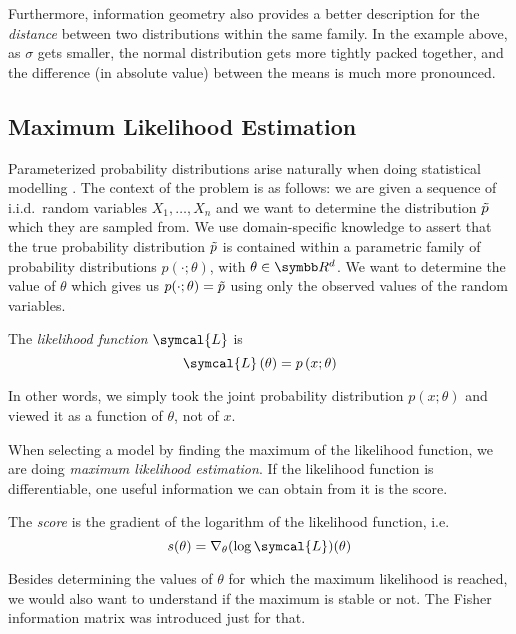 Furthermore, information geometry also provides a better description for the \emph{distance} between two distributions within the same family. In the example above, as \(\sigma\) gets smaller, the normal distribution gets more tightly packed together, and the difference (in absolute value) between the means is much more pronounced.

\subsection{Maximum Likelihood Estimation}

Parameterized probability distributions arise naturally when doing statistical modelling \cite{Rossi2018}. The context of the problem is as follows: we are given a sequence of i.i.d.\ random variables \(X_1, \dots, X_n\) and we want to determine the distribution \(\Tilde{p}\) which they are sampled from. We use domain-specific knowledge to assert that the true probability distribution \(\Tilde{p}\) is contained within a parametric family of probability distributions \(p(\cdot; \theta)\), with \(\theta \in \reals^d\). We want to determine the value of \(\theta\) which gives us \(p(\cdot; \theta) = \Tilde{p}\) using only the observed values of the random variables.

\begin{definition}
The \emph{likelihood function} \(\symcal{L}\) is
\[
    \symcal{L} \left(\theta\right) = p\left(x; \theta\right)
\]
\end{definition}

In other words, we simply took the joint probability distribution \(p\left(x; \theta\right)\) and viewed it as a function of \(\theta\), not of \(x\).

When selecting a model by finding the maximum of the likelihood function, we are doing \emph{maximum likelihood estimation}. If the likelihood function is differentiable, one useful information we can obtain from it is the score.

\begin{definition}
The \emph{score} is the gradient of the logarithm of the likelihood function, i.e.\
\[
    s(\theta) = \nabla_{\theta} (\log \symcal{L}) (\theta)
\]
\end{definition}

Besides determining the values of \(\theta\) for which the maximum likelihood is reached, we would also want to understand if the maximum is stable or not. The Fisher information matrix was introduced just for that.

